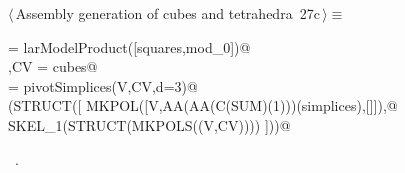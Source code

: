 \documentclass[11pt,oneside]{article}	%
\begin{document}
\begin{flushleft} \small
\begin{minipage}{\linewidth} \label{scrap68}
\protect{}$\langle\,$Assembly generation of cubes and tetrahedra\nobreak\ {\footnotesize 27c}$\,\rangle\equiv$
\vspace{-1ex}
\begin{list}{}{} \item
\mbox{}\verb@cubes = larModelProduct([squares,mod_0])@\\
\mbox{}\verb@V,CV = cubes@\\
\mbox{}\verb@simplices = pivotSimplices(V,CV,d=3)@\\
\mbox{}\verb@VIEW(STRUCT([ MKPOL([V,AA(AA(C(SUM)(1)))(simplices),[]]),@\\
\mbox{}\verb@           SKEL_1(STRUCT(MKPOLS((V,CV)))) ]))@\\
\mbox{}\verb@@{\NWsep}
\end{list}
\vspace{-1ex}
\footnotesize\addtolength{\baselineskip}{-1ex}
\begin{list}{}{\setlength{\itemsep}{-\parsep}\setlength{\itemindent}{-\leftmargin}}
\item \NWtxtMacroRefIn\ .
\end{list}
\end{minipage}\\[4ex]
\end{flushleft}









\end{document}

